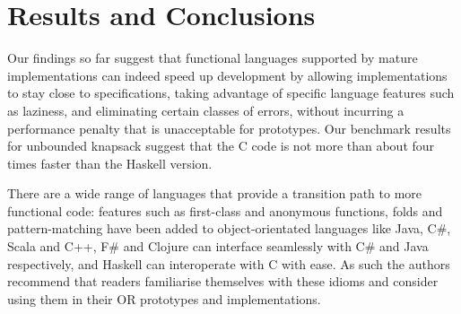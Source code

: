 \section{Results and Conclusions}

Our findings so far suggest that functional languages supported by mature
implementations can indeed speed up development by allowing implementations to
stay close to specifications, taking advantage of specific language features
such as laziness, and eliminating certain classes of errors, without incurring
a performance penalty that is unacceptable for prototypes. Our
benchmark results for unbounded knapsack suggest that the C
code is not more than about four times faster than the Haskell version.

There are a wide range of languages that provide a transition path to more functional code: features such as first-class and anonymous functions, folds and pattern-matching have been added to object-orientated languages like Java, C\#, Scala and C++, F\# and Clojure can interface seamlessly with C\# and Java respectively, and Haskell can interoperate with C with ease. As such the authors recommend that readers familiarise themselves with these idioms and consider using them in their OR prototypes and implementations.
